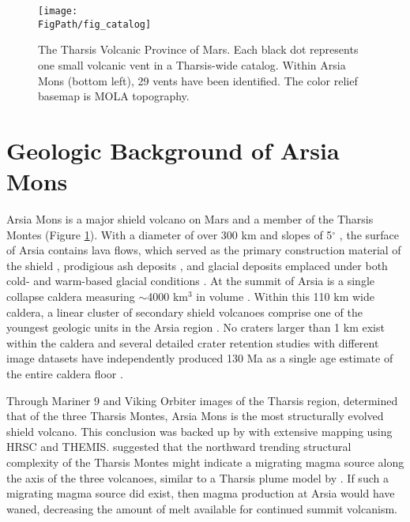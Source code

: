 \begin{figure}
\centering
\texttt{[image: \\FigPath/fig\_catalog]}
\caption{The Tharsis Volcanic Province of Mars. Each black dot represents one small volcanic vent in a Tharsis-wide catalog. Within Arsia Mons (bottom left), 29 vents have been identified. The color relief basemap is MOLA topography.}
\label{fig_locatormap}
\end{figure}

\section{Geologic Background of Arsia Mons}

Arsia Mons is a major shield volcano on Mars and a member of the Tharsis Montes (Figure \ref{fig_locatormap}). With a diameter of over 300 km and slopes of 5$^{\circ}$ \citep{plescia2004morphometric}, the surface of Arsia contains lava flows, which served as the primary construction material of the shield \citep{mouginis2008lava}, prodigious ash deposits \citep{mouginis2002prodigious}, and glacial deposits \citep{head2003cold} emplaced under both cold- and warm-based glacial conditions \citep{scanlon2015volcanism}. At the summit of Arsia is a single collapse caldera measuring $\sim$4000 km$^3$ in volume \citep{wilson2001evidence}. Within this 110 km wide caldera, a linear cluster of secondary shield volcanoes comprise one of the youngest geologic units in the Arsia region \citep{carr1977some,scott1995geologic}. No craters larger than 1 km exist within the caldera and several detailed crater retention studies with different image datasets have independently produced 130 Ma as a single age estimate of the entire caldera floor \citep{neukum2004recent,werner2009global,robbins2011volcanic}.

Through Mariner 9 and Viking Orbiter images of the Tharsis region, \citet{crumpler1978structural} determined that of the three Tharsis Montes, Arsia Mons is the most structurally evolved shield volcano. This conclusion was backed up by \citet{bleacher2007tharsis} with extensive mapping using HRSC and THEMIS. \citet{bleacher2007tharsis} suggested that the northward trending structural complexity of the Tharsis Montes might indicate a migrating magma source along the axis of the three volcanoes, similar to a Tharsis plume model by \citet{mege1996plume}. If such a migrating magma source did exist, then magma production at Arsia would have waned, decreasing the amount of melt available for continued summit volcanism.

